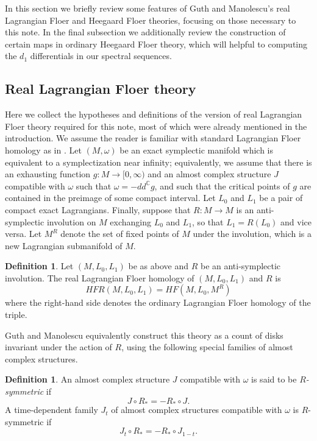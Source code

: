 \documentclass[11pt,reqno]{amsart}
\theoremstyle{definition}
\newtheorem{define}[thm]{Definition}
\theoremstyle{remark}
\newcommand{\HF}{\mathit{HF}}
\newcommand{\HFR}{\mathit{HFR}}
\numberwithin{equation}{section}
\newcommand\co{\colon}
\begin{document}
In this section we briefly review some features of Guth and Manolescu's real Lagrangian Floer and Heegaard Floer theories, focusing on those necessary to this note. In the final subsection we additionally review the construction of certain maps in ordinary Heegaard Floer theory, which will helpful to computing the $d_1$ differentials in our spectral sequences.

\subsection{Real Lagrangian Floer theory} \label{subsec:realsetup}

Here we collect the hypotheses and definitions of the version of real Lagrangian Floer theory required for this note, most of which were already mentioned in the introduction. We assume the reader is familiar with standard Lagrangian Floer homology as in \cite{Floer88:LagrangianHF}. Let $(M, \omega)$ be an exact symplectic manifold which is equivalent to a symplectization near infinity; equivalently, we assume that there is an exhausting function $g \co M \rightarrow [0, \infty)$ and an almost complex structure $J$ compatible with $\omega$ such that $\omega = -d d^{\mathbb C} g$, and such that the critical points of $g$ are contained in the preimage of some compact interval. Let $L_0$ and $L_1$ be a pair of compact exact Lagrangians. Finally, suppose that $R \co M \rightarrow M$ is an anti-symplectic involution on $M$ exchanging $L_0$ and $L_1$, so that $L_1 = R(L_0)$ and vice versa. Let $M^R$ denote the set of fixed points of $M$ under the involution, which is a new Lagrangian submanifold of $M$.

\begin{define} \cite[Section 2]{GM:real} Let $(M, L_0, L_1)$ be as above and $R$ be an anti-symplectic involution. The real Lagrangian Floer homology of $(M, L_0, L_1)$ and $R$ is
%
\[ \HFR(M, L_0, L_1) = \HF(M, L_0, M^R)\]
%
where the right-hand side denotes the ordinary Lagrangian Floer homology of the triple.
\end{define}

Guth and Manolescu equivalently construct this theory as a count of disks invariant under the action of $R$, using the following special families of almost complex structures.

\begin{define} An almost complex structure $J$ compatible with $\omega$ is said to be \emph{$R$-symmetric} if
%
\[ J \circ R_* = -R_* \circ J.\]
A time-dependent family $J_t$ of almost complex structures compatible with $\omega$ is $R$-symmetric if 
\[
J_t \circ R_* = -R_* \circ J_{1-t}.
\]
\end{define}
\end{document}
